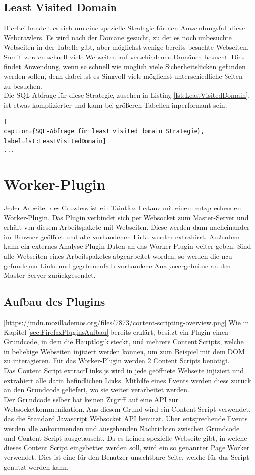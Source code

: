 \subsection{Least Visited Domain}
Hierbei handelt es sich um eine spezielle Strategie für den Anwendungsfall diese Webcrawlers. Es wird nach der Domäne gesucht, zu der es noch unbesuchte Webseiten in der Tabelle gibt, aber möglichst wenige bereits besuchte Webseiten. Somit werden schnell viele Webseiten auf verschiedenen Domänen besucht. Dies findet Anwendung, wenn so schnell wie möglich viele Sicherheitslücken gefunden werden sollen, denn dabei ist es Sinnvoll viele möglichst unterschiedliche Seiten zu besuchen. \\
Die SQL-Abfrage für diese Strategie, zusehen in Listing \ref{lst:LeastVisitedDomain}, ist etwas komplizierter und kann bei größeren Tabellen inperformant sein.

\begin{lstlisting}[
caption={SQL-Abfrage für least visited domain Strategie},
label=lst:LeastVisitedDomain]
...
\end{lstlisting}

\section{Worker-Plugin}
Jeder Arbeiter des Crawlers ist ein Taintfox Instanz mit einem entsprechenden Worker-Plugin. Das Plugin verbindet sich per Websocket zum Master-Server und erhält von diesem Arbeitspakete mit Webseiten. Diese werden dann nacheinander im Browser geöffnet und alle vorhandenen Links werden extrahiert. Außerdem kann ein externes Analyse-Plugin Daten an das Worker-Plugin weiter geben. Sind alle Webseiten eines Arbeitspaketes abgearbeitet worden, so werden die neu gefundenen Links und gegebenenfalls vorhandene Analyseergebnisse an den Master-Server zurückgesendet.
\subsection{Aufbau des Plugins}
 [https://mdn.mozillademos.org/files/7873/content-scripting-overview.png]
Wie in Kapitel \ref{sec:FirefoxPluginsAufbau} bereits erklärt, besitzt ein Plugin einen Grundcode, in dem die Hauptlogik steckt, und mehrere Content Scripts, welche in beliebige Webseiten injiziert werden können, um zum Beispiel mit dem DOM zu interagieren. Für das Worker-Plugin werden 2 Content Scripts benötigt. \\
Das Content Script extractLinks.js wird in jede geöffnete Webseite injiziert und extrahiert alle darin befindlichen Links. Mithilfe eines Events werden diese zurück an den Grundcode geliefert, wo sie weiter verarbeitet werden. \\
Der Grundcode selber hat keinen Zugriff auf eine API zur Websocketkommunikation. Aus diesem Grund wird ein Content Script verwendet, das die Standard Javascript Websocket API benutzt. Über entsprechende Events werden alle ankommenden und ausgehenden Nachrichten zwischen Grundcode und Content Script ausgetauscht. Da es keinen spezielle Webseite gibt, in welche dieses Content Script eingebettet werden soll, wird ein so genannter Page Worker verwendet. Dies ist eine für den Benutzer unsichtbare Seite, welche für das Script genutzt werden kann.
